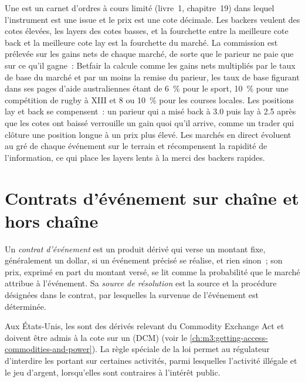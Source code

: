 Une  est un carnet d'ordres à cours limité (livre~1, chapitre~19) dans lequel l'instrument est une issue et le prix est une cote décimale.
Les backers veulent des cotes élevées, les layers des cotes basses, et la fourchette entre la meilleure cote back et la meilleure cote lay est la fourchette du marché. La commission est prélevée sur les gains nets de
chaque marché, de sorte que le parieur ne paie que sur ce qu'il gagne~: Betfair la calcule comme les gains nets multipliés par le taux de base du marché et par un moins la
remise du parieur, les taux de base figurant dans ses pages d'aide australiennes étant de 6~\% pour le sport, 10~\% pour une compétition de rugby à XIII et 8 ou 10~\% pour les
courses locales. Les positions lay et back se compensent~: un parieur qui a misé back à 3.0 puis lay à 2.5 après que les cotes ont baissé verrouille un gain
quoi qu'il arrive, comme un trader qui clôture une position longue à un prix plus élevé. Les marchés en direct évoluent au gré de chaque événement sur le
terrain et récompensent la rapidité de l'information, ce qui place les layers lents à la merci des backers rapides.

\section{Contrats d'événement sur chaîne et hors chaîne}

\begin{definition}\label{def:m3:prediction-and-betting-markets:event}
Un \emph{contrat d'événement} est un produit dérivé qui verse un montant fixe, généralement un dollar, si un événement précisé se réalise, et rien
sinon~; son prix, exprimé en part du montant versé, se lit comme la probabilité que le marché attribue à l'événement. Sa \emph{source de résolution}
est la source et la procédure désignées dans le contrat, par lesquelles la survenue de l'événement est déterminée.
\end{definition}

Aux États-Unis, les  sont des dérivés relevant du Commodity Exchange Act et doivent être admis à la cote sur un
 (DCM) (voir le \cref{ch:m3:getting-access-commodities-and-power}). La règle spéciale de la loi permet au régulateur d'interdire les  portant sur certaines
activités, parmi lesquelles l'activité illégale et le jeu d'argent, lorsqu'elles sont contraires à l'intérêt public.

